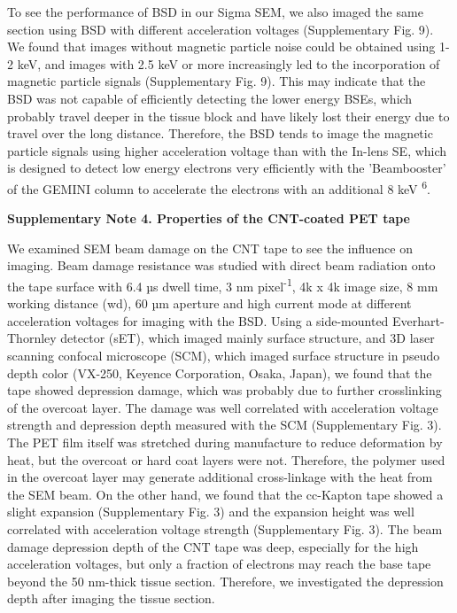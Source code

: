 \documentclass{article}
\begin{document}
To see the performance of BSD in our Sigma SEM, we also imaged the same section using BSD with different acceleration voltages (Supplementary Fig. 9). We found that images without magnetic particle noise could be obtained using 1-2 keV, and images 
with 2.5 keV or more increasingly led to the incorporation of magnetic particle signals (Supplementary Fig. 9). This may indicate that the BSD was not capable of efficiently detecting the lower energy BSEs, which probably travel deeper in the tissue block and have likely lost their energy due to travel over the long distance. Therefore, the BSD tends to image the magnetic particle signals using higher acceleration voltage than with the In-lens SE, which is designed to detect low energy electrons very efficiently with the 'Beambooster' of the GEMINI column to accelerate the electrons with an additional 8 keV \textsuperscript{6}.

\textbf{Supplementary Note 4.  Properties of the CNT-coated PET tape}

We examined SEM beam damage on the CNT tape to see the influence on imaging. Beam damage resistance was studied with direct beam radiation onto the tape surface with 6.4 µs dwell time, 3 nm pixel\textsuperscript{-1}, 4k x 4k image size, 8 mm working distance (wd), 60 µm aperture and high current mode at different acceleration voltages for imaging with the BSD. Using a side-mounted Everhart-Thornley detector (sET), which imaged mainly surface structure, and 3D laser scanning confocal microscope (SCM), which imaged surface structure in pseudo depth color (VX-250, Keyence Corporation, Osaka, Japan), we found that the tape showed depression damage, which was probably due to further crosslinking of the overcoat layer. The damage was well correlated with acceleration voltage strength and depression depth measured with the SCM (Supplementary Fig. 3). The PET film itself was stretched during manufacture to reduce deformation by heat, but the overcoat or hard coat layers were not. Therefore, the polymer used in the overcoat layer may generate additional cross-linkage with the heat from the SEM beam. On the other hand, we found that the cc-Kapton tape showed a slight expansion (Supplementary Fig. 3) and the expansion height was well correlated with acceleration voltage strength (Supplementary Fig. 3). The beam damage depression depth of the CNT tape was deep, especially for the high acceleration voltages, but only a fraction of electrons may reach the base tape beyond the 50 nm-thick tissue section. Therefore, we investigated the depression depth after imaging the tissue section.
\end{document}
